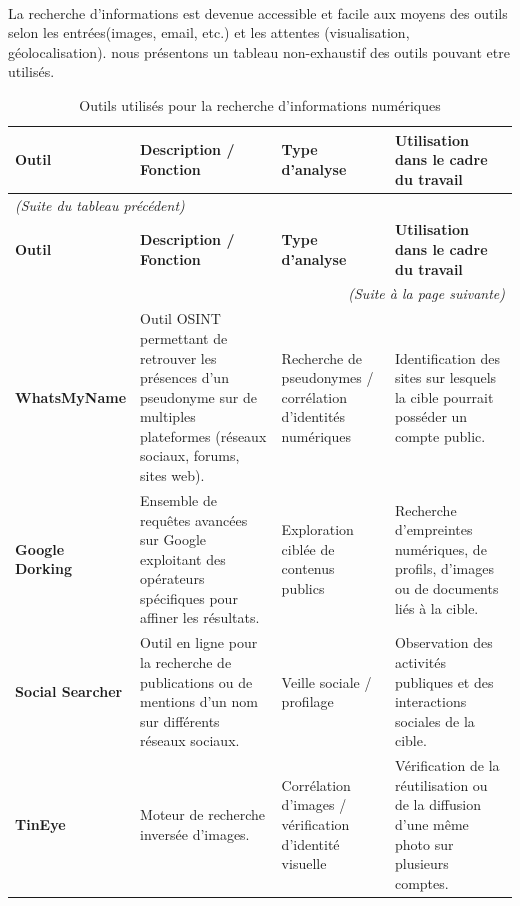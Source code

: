 \documentclass[memoire,12pt]{report}
\begin{document}
 \paragraph{}La recherche d'informations est devenue accessible et facile aux moyens des outils selon les entrées(images, email, etc.) et les attentes (visualisation, géolocalisation). nous présentons un tableau non-exhaustif des outils pouvant etre utilisés. 
\begin{longtable}{|p{3cm}|p{4cm}|p{3cm}|p{5cm}|}
\caption{Outils utilisés pour la recherche d’informations numériques} \\
\hline
\textbf{Outil} & \textbf{Description / Fonction} & \textbf{Type d’analyse} & \textbf{Utilisation dans le cadre du travail} \\ 
\hline
\endfirsthead

\multicolumn{4}{l}{\textit{(Suite du tableau précédent)}}\\
\hline
\textbf{Outil} & \textbf{Description / Fonction} & \textbf{Type d’analyse} & \textbf{Utilisation dans le cadre du travail} \\ 
\hline
\endhead

\hline
\multicolumn{4}{r}{\textit{(Suite à la page suivante)}}\\
\endfoot

\hline
\endlastfoot

\textbf{WhatsMyName} & 
Outil OSINT permettant de retrouver les présences d’un pseudonyme sur de multiples plateformes (réseaux sociaux, forums, sites web). &
Recherche de pseudonymes / corrélation d’identités numériques &
Identification des sites sur lesquels la cible pourrait posséder un compte public. \\ \hline

\textbf{Google Dorking} &
Ensemble de requêtes avancées sur Google exploitant des opérateurs spécifiques pour affiner les résultats. &
Exploration ciblée de contenus publics &
Recherche d’empreintes numériques, de profils, d’images ou de documents liés à la cible. \\ \hline

\textbf{Social Searcher} &
Outil en ligne pour la recherche de publications ou de mentions d’un nom sur différents réseaux sociaux. &
Veille sociale / profilage &
Observation des activités publiques et des interactions sociales de la cible. \\ \hline

\textbf{TinEye} &
Moteur de recherche inversée d’images. &
Corrélation d’images / vérification d’identité visuelle &
Vérification de la réutilisation ou de la diffusion d’une même photo sur plusieurs comptes. \\ \hline


\end{longtable}
\end{document}
